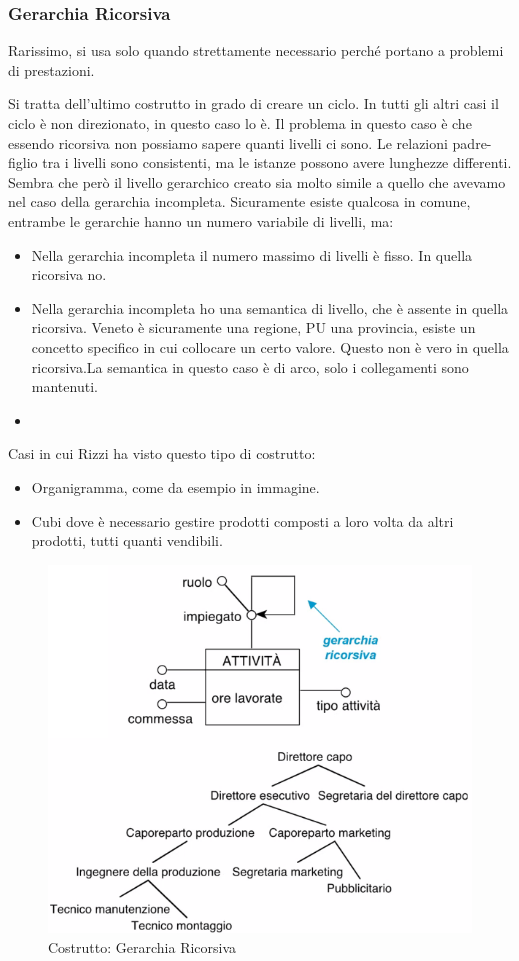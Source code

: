 \subsubsection{Gerarchia Ricorsiva}
\begin{info}
	Rarissimo, si usa solo quando strettamente necessario perché portano a problemi di prestazioni.
\end{info}
Si tratta dell'ultimo costrutto in grado di creare un ciclo. In tutti gli altri casi il ciclo è non direzionato, in questo caso lo è.\newline
Il problema in questo caso è che essendo ricorsiva non possiamo sapere quanti livelli ci sono.\newline
Le relazioni padre-figlio tra i livelli sono consistenti, ma le istanze possono avere lunghezze differenti.\newline
Sembra che però il livello gerarchico creato sia molto simile a quello che avevamo nel caso della gerarchia incompleta. Sicuramente esiste qualcosa in comune, entrambe le gerarchie hanno un numero variabile di livelli, ma:
\begin{itemize}
	\item Nella gerarchia incompleta il numero massimo di livelli è fisso. In quella ricorsiva no.
	\item Nella gerarchia incompleta ho una semantica di livello, che è assente in quella ricorsiva. Veneto è sicuramente una regione, PU una provincia, esiste un concetto specifico in cui collocare un certo valore. Questo non è vero in quella ricorsiva.La semantica in questo caso è di arco, solo i collegamenti sono mantenuti.
	\item  
\end{itemize}
Casi in cui Rizzi ha visto questo tipo di costrutto:
\begin{itemize}
	\item Organigramma, come da esempio in immagine.
	\item Cubi dove è necessario gestire prodotti composti a loro volta da altri prodotti, tutti quanti vendibili.
\end{itemize}
\begin{figure}[H]
	\begin{center}
		\includegraphics[width=0.6\linewidth]{img/recursive.png}
		\caption{Costrutto: Gerarchia Ricorsiva}
	\end{center}
\end{figure}


